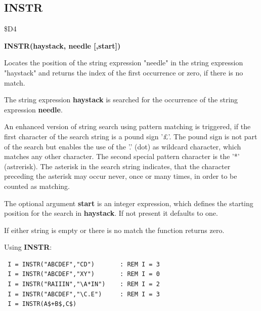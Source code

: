 
\newpage
\subsection{INSTR}
\begin{description}[leftmargin=2cm,style=nextline]
\item [Token:] \$D4
\item [Format:] {\bf INSTR(haystack, needle [,start])}
\item [Usage:] Locates the
               position of the string expression "needle"
               in the string expression "haystack" and
               returns the index of the first occurrence
               or zero, if there is no match.

               The string expression {\bf haystack}
               is searched for the occurrence of the
               string expression
               {\bf needle}.

               An enhanced version of string search using pattern
               matching is triggered, if the first character of
               the search string is a pound sign '£'.
               The pound sign is not part of the search but enables the use
               of the '.' (dot) as wildcard character, which matches any
               other character. The second special pattern character is
               the '*' (astrerisk). The asterisk in the search string indicates,
               that the character preceding the asterisk may occur
               never, once or many times, in order to be counted as matching.

               The optional argument {\bf start} is an integer
               expression, which defines the starting position
               for the search in {\bf haystack}. If not present
               it defaults to one.

\item [Remarks:] If either string is empty or there is no match
               the function returns zero.

\item [Example:] Using {\bf INSTR}:
\begin{tcolorbox}[colback=black,coltext=white]
\verbatimfont{\codefont}
\begin{verbatim}
 I = INSTR("ABCDEF","CD")       : REM I = 3
 I = INSTR("ABCDEF","XY")       : REM I = 0
 I = INSTR("RAIIIN","\A*IN")    : REM I = 2
 I = INSTR("ABCDEF","\C.E")     : REM I = 3
 I = INSTR(A$+B$,C$)
\end{verbatim}
\end{tcolorbox}
\end{description}

